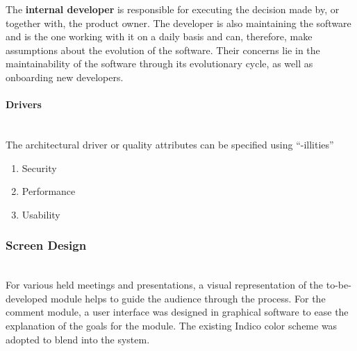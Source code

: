 The \textbf{internal developer} is responsible for executing the decision made by, or together with, the product owner. The developer is also maintaining the software and is the one working with it on a daily basis and can, therefore, make assumptions about the evolution of the software. Their concerns lie in the maintainability of the software through its evolutionary cycle, as well as onboarding new developers.
\vspace{0.5cm}
\paragraph{Drivers}\mbox{}\\

The architectural driver or quality attributes can be specified using “-illities”

\begin{enumerate}
    \item Security
    \item Performance
    \item Usability
\end{enumerate}

\subsubsection{Screen Design}\mbox{}\\

For various held meetings and presentations, a visual representation of the to-be-developed module helps to guide the audience through the process. For the comment module, a user interface was designed in graphical software to ease the explanation of the goals for the module. The existing Indico color scheme was adopted to blend into the system.

